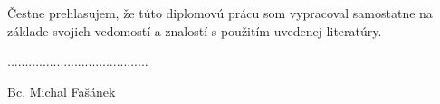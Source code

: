 \vspace*{\fill}
Čestne prehlasujem, že túto diplomovú prácu som vypracoval samostatne na základe svojich vedomostí a znalostí s použitím uvedenej literatúry.\\
 \begin{flushright}
 	
 	........................................
 	
 	
 	Bc. Michal Fašánek\space
 	
 \end{flushright}